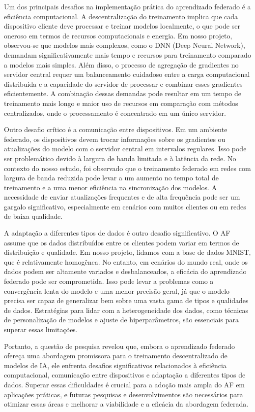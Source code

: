 Um dos principais desafios na implementação prática do aprendizado federado é a eficiência computacional. A descentralização do treinamento implica que cada dispositivo cliente deve processar e treinar modelos localmente, o que pode ser oneroso em termos de recursos computacionais e energia. Em nosso projeto, observou-se que modelos mais complexos, como o DNN (Deep Neural Network), demandam significativamente mais tempo e recursos para treinamento comparado a modelos mais simples. Além disso, o processo de agregação de gradientes no servidor central requer um balanceamento cuidadoso entre a carga computacional distribuída e a capacidade do servidor de processar e combinar esses gradientes eficientemente. A combinação dessas demandas pode resultar em um tempo de treinamento mais longo e maior uso de recursos em comparação com métodos centralizados, onde o processamento é concentrado em um único servidor.

Outro desafio crítico é a comunicação entre dispositivos. Em um ambiente federado, os dispositivos devem trocar informações sobre os gradientes ou atualizações do modelo com o servidor central em intervalos regulares. Isso pode ser problemático devido à largura de banda limitada e à latência da rede. No contexto do nosso estudo, foi observado que o treinamento federado em redes com largura de banda reduzida pode levar a um aumento no tempo total de treinamento e a uma menor eficiência na sincronização dos modelos. A necessidade de enviar atualizações frequentes e de alta frequência pode ser um gargalo significativo, especialmente em cenários com muitos clientes ou em redes de baixa qualidade.

A adaptação a diferentes tipos de dados é outro desafio significativo. O AF assume que os dados distribuídos entre os clientes podem variar em termos de distribuição e qualidade. Em nosso projeto, lidamos com a base de dados MNIST, que é relativamente homogênea. No entanto, em cenários do mundo real, onde os dados podem ser altamente variados e desbalanceados, a eficácia do aprendizado federado pode ser comprometida. Isso pode levar a problemas como a convergência lenta do modelo e uma menor precisão geral, já que o modelo precisa ser capaz de generalizar bem sobre uma vasta gama de tipos e qualidades de dados. Estratégias para lidar com a heterogeneidade dos dados, como técnicas de personalização de modelos e ajuste de hiperparâmetros, são essenciais para superar essas limitações.

Portanto, a questão de pesquisa revelou que, embora o aprendizado federado ofereça uma abordagem promissora para o treinamento descentralizado de modelos de IA, ele enfrenta desafios significativos relacionados à eficiência computacional, comunicação entre dispositivos e adaptação a diferentes tipos de dados. Superar essas dificuldades é crucial para a adoção mais ampla do AF em aplicações práticas, e futuras pesquisas e desenvolvimentos são necessários para otimizar essas áreas e melhorar a viabilidade e a eficácia da abordagem federada.

